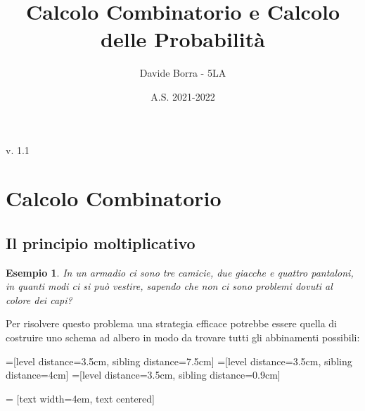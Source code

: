 \documentclass{article}     %
\title{Calcolo Combinatorio e Calcolo delle Probabilità}
\author{Davide Borra - 5LA}
\date{A.S. 2021-2022}
\newtheorem{ex}{Esempio}[section]
\begin{document}
    \begin{titlepage}
    \maketitle
    \tableofcontents
    \vspace{\fill}
    \hspace{\fill} v. 1.1   %
    \end{titlepage}
    
    \chead{}
    
    \section{Calcolo Combinatorio}
        \subsection{Il principio moltiplicativo}
            \begin{ex}
                In un armadio ci sono tre camicie, due giacche e quattro pantaloni, in quanti modi ci si può vestire, sapendo che non ci sono problemi dovuti al colore dei capi?
            \end{ex}
            
            Per risolvere questo problema una strategia efficace potrebbe essere quella di costruire uno schema ad albero in modo da trovare tutti gli abbinamenti possibili:
            
                =[level distance=3.5cm, sibling distance=7.5cm]
                =[level distance=3.5cm, sibling distance=4cm]
                =[level distance=3.5cm, sibling distance=0.9cm]
                
                 = [text width=4em, text centered]
                
\end{document}
